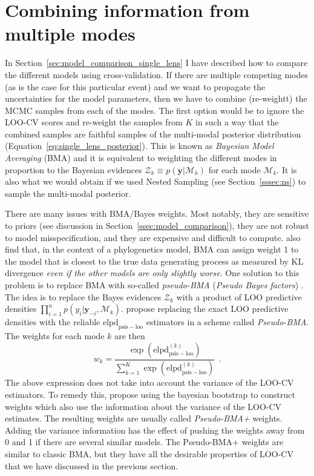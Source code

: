 \documentclass[12pt,dvipsnames]{report}
\renewcommand{\vec}[1]{\boldsymbol{\mathbf{#1}}}
\newcommand{\hquad}{~~}
\begin{document}
\section{Combining information from multiple modes}
\label{sec:averaging_over_modes}
In Section~\ref{sec:model_comparison_single_lens} I
have described how to compare the different models using cross-validation. If there are 
multiple competing modes (as is the case for this particular event) and we want to 
propagate the uncertainties for the model parameters, then we have to combine
(re-weightt) the MCMC samples from each of the modes. The first option would be to ignore 
the LOO-CV scores and re-weight the samples from $K$ in such a way that the combined 
samples are faithful samples of the multi-modal posterior distribution 
(Equation~\ref{eq:single_lens_posterior}).
This is known as \emph{Bayesian Model Averaging} (BMA) and it is equivalent to weighting 
the different modes in proportion to the Bayesian evidences 
$\mathcal{Z}_k\equiv  p(\vec y|\mathcal{M}_k)$ for each mode $\mathcal{M}_k$.
It is also what we would obtain if we used Nested Sampling (see Section~\ref{sssec:ns})
to sample the multi-modal posterior. 

There are many issues with BMA/Bayes weights. Most notably, they are sensitive to priors 
(see discussion in Section~\ref{ssec:model_comparison}), they are  not robust to model 
misspecification, and they are expensive and difficult to compute. 
\citet{doi:10.1073/pnas.1712673115} also find that, in the context of a phylogenetics
model, BMA can assign weight 1 to the model that is closest to the 
true data generating process as measured by KL divergence \emph{even if the other models 
are only slightly worse}. 
One solution to this problem is to replace BMA with so-called \emph{pseudo-BMA}
(\emph{Pseudo Bayes factors}) \citep{10.2307/2286745}. The idea is to replace the 
Bayes evidences $\mathcal{Z}_k$ with a product of LOO predictive 
densities $\prod_{i=1}^n p(y_i|\vec y_{-i},\mathcal{M}_k)$. 
\citet{0.1214/17-BA1091} propose replacing the exact LOO predictive densities with 
the reliable $\mathrm{elpd}_\mathrm{psis-loo}$ estimators in a scheme called 
\emph{Pseudo-BMA}.
The weights for each mode $k$ are then 
\begin{equation}
    w_k =\frac{\exp\left(\mathrm{elpd}_\mathrm{psis-loo}^{(k)}\right)}{\sum_{k=1}^K\exp\left(\mathrm{elpd}_\mathrm{psis-loo}^{(k)}\right)}
    \hquad .
\end{equation}
The above expression does not take into account the variance of the LOO-CV estimators.
To remedy this, \citet{0.1214/17-BA1091} propose
using the bayesian bootstrap \citep{10.2307/2240875,Vehtari2002BayesianMA} 
to construct weights which also use the information about the variance of the LOO-CV estimates. 
The resulting weights are usually called \emph{Pseudo-BMA+} weights. 
Adding the variance information has the effect of pushing the weights away from 0 and 1 if there are 
several similar models. The Pseudo-BMA+ weights are similar to classic BMA, but they have all 
the desirable properties of LOO-CV that we have discussed in the previous section.
\end{document}
